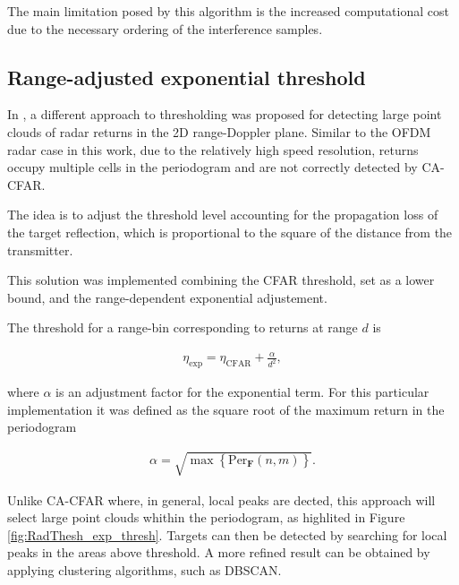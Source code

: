 The main limitation posed by this algorithm is the increased computational cost due to the necessary ordering of the interference samples.


\subsection{Range-adjusted exponential threshold}

	
	In \cite{Wagner_Feger_Stelzer_2017}, a different approach to thresholding was proposed for detecting large point clouds of radar returns in the 2D range-Doppler plane. Similar to the OFDM radar case in this work, due to the relatively high speed resolution, returns occupy multiple cells in the periodogram and are not correctly detected by CA-CFAR.
	
	The idea is to adjust the threshold level accounting for the propagation loss of the target reflection, which is proportional to the square of the distance from the transmitter. 
	
	This solution was implemented combining the CFAR threshold, set as a lower bound, and the range-dependent exponential adjustement.
	
	The threshold for a range-bin corresponding to returns at range $d$ is
	
	\begin{align*}
		\eta_{\text{exp}} = \eta_{\text{CFAR}} + \frac{\alpha}{d^2},
	\end{align*} 
	
	where $\alpha$ is an adjustment factor for the exponential term. For this particular implementation it was defined as the square root of the maximum return in the periodogram
	
	\begin{align*}
		\alpha = \sqrt{\max{ \left\{\text{Per}_{\bm{F}}(n,m)\right\} }}.
	\end{align*}
	
	Unlike CA-CFAR where, in general, local peaks are dected, this approach will select large point clouds whithin the periodogram, as highlited in Figure \ref{fig:RadThesh_exp_thresh}.
	Targets can then be detected by searching for local peaks in the areas above threshold. A more refined result can be obtained by applying clustering algorithms, such as DBSCAN.
	
